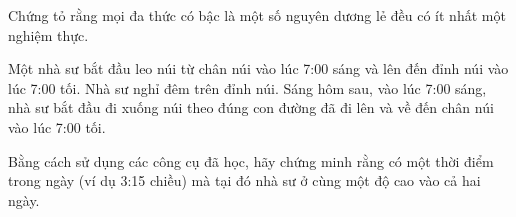 \begin{exercise}[*]
	Chứng tỏ rằng mọi đa thức có bậc là một số nguyên dương lẻ đều có ít nhất một nghiệm thực.
\end{exercise}

\begin{exercise}[*]
    Một nhà sư bắt đầu leo núi từ chân núi vào lúc 7:00 sáng và lên đến đỉnh núi vào lúc 7:00 tối. Nhà sư nghỉ đêm trên đỉnh núi. Sáng hôm sau, vào lúc 7:00 sáng, nhà sư bắt đầu đi xuống núi theo đúng con đường đã đi lên và về đến chân núi vào lúc 7:00 tối.
	
    Bằng cách sử dụng các công cụ đã học, hãy chứng minh rằng có một thời điểm trong ngày (ví dụ 3:15 chiều) mà tại đó nhà sư ở cùng một độ cao vào cả hai ngày.
\end{exercise}